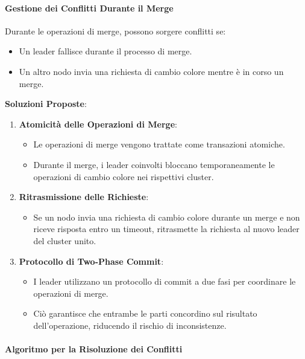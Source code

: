 \documentclass[12pt, a4paper]{report}
\begin{document}
\paragraph{Gestione dei Conflitti Durante il Merge}

Durante le operazioni di merge, possono sorgere conflitti se:

\begin{itemize}
    \item Un leader fallisce durante il processo di merge.
    \item Un altro nodo invia una richiesta di cambio colore mentre è in corso un merge.
\end{itemize}

\textbf{Soluzioni Proposte}:

\begin{enumerate}
    \item \textbf{Atomicità delle Operazioni di Merge}:
    \begin{itemize}
        \item Le operazioni di merge vengono trattate come transazioni atomiche.
        \item Durante il merge, i leader coinvolti bloccano temporaneamente le operazioni di cambio colore nei rispettivi cluster.
    \end{itemize}
    \item \textbf{Ritrasmissione delle Richieste}:
    \begin{itemize}
        \item Se un nodo invia una richiesta di cambio colore durante un merge e non riceve risposta entro un timeout, ritrasmette la richiesta al nuovo leader del cluster unito.
    \end{itemize}
    \item \textbf{Protocollo di Two-Phase Commit}:
    \begin{itemize}
        \item I leader utilizzano un protocollo di commit a due fasi per coordinare le operazioni di merge.
        \item Ciò garantisce che entrambe le parti concordino sul risultato dell'operazione, riducendo il rischio di inconsistenze.
    \end{itemize}
\end{enumerate}

\paragraph{Algoritmo per la Risoluzione dei Conflitti}
\end{document}
